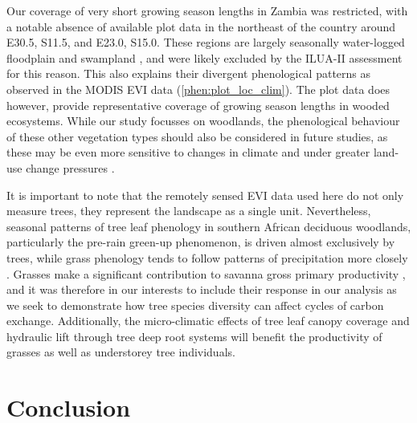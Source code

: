 \begin{refsection}
Our coverage of very short growing season lengths in Zambia was restricted, with a notable absence of available plot data in the northeast of the country around E30.5\textdegree{}, S11.5\textdegree{}, and E23.0\textdegree{}, S15.0\textdegree{}. These regions are largely seasonally water-logged floodplain and swampland \citep{White1983, Dinerstein2017}, and were likely excluded by the ILUA-II assessment for this reason. This also explains their divergent phenological patterns as observed in the MODIS EVI data (\autoref{phen:plot_loc_clim}). The plot data does however, provide representative coverage of growing season lengths in wooded ecosystems. While our study focusses on woodlands, the phenological behaviour of these other vegetation types should also be considered in future studies, as these may be even more sensitive to changes in climate \citep{Dean2018} and under greater land-use change pressures \citep{Langan2018}.

It is important to note that the remotely sensed EVI data used here do not only measure trees, they represent the landscape as a single unit. Nevertheless, seasonal patterns of tree leaf phenology in southern African deciduous woodlands, particularly the pre-rain green-up phenomenon, is driven almost exclusively by trees, while grass phenology tends to follow patterns of precipitation more closely \citep{Whitecross2017, Archibald2007, Higgins2011}. Grasses make a significant contribution to savanna gross primary productivity \citep{Lloyd2008}, and it was therefore in our interests to include their response in our analysis as we seek to demonstrate how tree species diversity can affect cycles of carbon exchange. Additionally, the micro-climatic effects of tree leaf canopy coverage and hydraulic lift through tree deep root systems will benefit the productivity of grasses as well as understorey tree individuals.

\section{Conclusion}
\label{phen:sec:conclusion}


\end{refsection}
